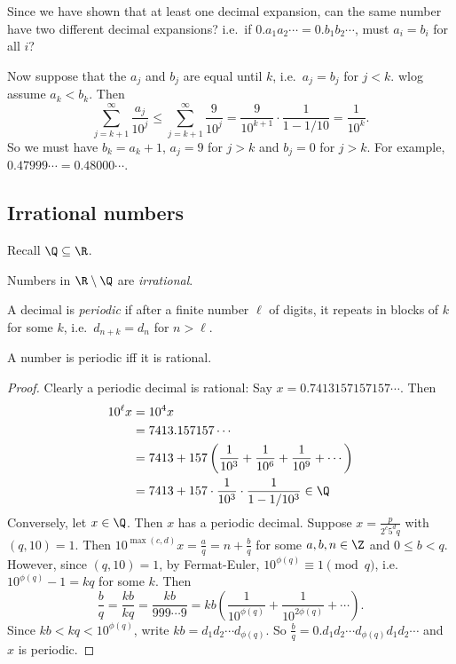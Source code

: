 \documentclass[a4paper]{article}
\begin{document}
Since we have shown that at least one decimal expansion, can the same number have two different decimal expansions? i.e.\ if $0.a_1a_2\cdots = 0.b_1b_2\cdots$, must $a_i = b_i$ for all $i$?

Now suppose that the $a_j$ and $b_j$ are equal until $k$, i.e.\ $a_j = b_j$ for $j < k$. wlog assume $a_k < b_k$. Then
\[
  \sum_{j = k + 1}^\infty \frac{a_j}{10^j} \leq \sum_{j = k+1}^\infty \frac{9}{10^j} = \frac{9}{10^{k+1}}\cdot \frac{1}{1 - 1/10} = \frac{1}{10^k}.
\]
So we must have $b_k = a_k + 1$, $a_j = 9$ for $j > k$ and $b_j = 0$ for $j > k$. For example, $0.47999\cdots = 0.48000\cdots$.

\subsection{Irrational numbers}
Recall $\Q\subseteq \R$.
\begin{defi}
  Numbers in $\R\setminus \Q$ are \emph{irrational}.
\end{defi}

\begin{defi}
  A decimal is \emph{periodic} if after a finite number $\ell$ of digits, it repeats in blocks of $k$ for some $k$, i.e.\ $d_{n + k} = d_n$ for $n > \ell$.
\end{defi}

\begin{prop}
  A number is periodic iff it is rational.
\end{prop}

\begin{proof}
  Clearly a periodic decimal is rational: Say $x = 0.7413157157157\cdots$. Then
  \begin{align*}
    10^\ell x &= 10^4x\\
    &= 7413.157157\cdots \\
    &= 7413 + 157\left(\frac{1}{10^3} + \frac{1}{10^6} + \frac{1}{10^9} + \cdots\right)\\
    &= 7413 + 157\cdot \frac{1}{10^3}\cdot \frac{1}{1 - 1/10^3}\in \Q
  \end{align*}
  Conversely, let $x\in \Q$. Then $x$ has a periodic decimal. Suppose $x = \frac{p}{2^c5^dq}$ with $(q, 10) = 1$. Then $10^{\max(c, d)}x = \frac{a}{q} = n + \frac{b}{q}$ for some $a, b, n\in \Z$ and $0\leq b < q$. However, since $(q, 10) = 1$, by Fermat-Euler, $10^{\phi(q)}\equiv 1\pmod q$, i.e.\ $10^{\phi(q)} - 1 = kq$ for some $k$. Then
  \[
    \frac{b}{q} = \frac{kb}{kq} = \frac{kb}{999\cdots 9} = kb\left(\frac{1}{10^{\phi(q)}} + \frac{1}{10^{2\phi(q)}} + \cdots \right).
  \]
  Since $kb < kq < 10^{\phi(q)}$, write $kb = d_1d_2\cdots d_{\phi(q)}$. So $\frac{b}{q} = 0.d_1d_2\cdots d_{\phi(q)}d_1d_2\cdots$ and $x$ is periodic.
\end{proof}
\end{document}
